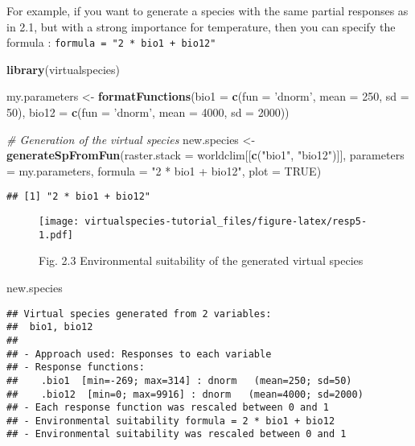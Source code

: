 \documentclass[]{article}
\newenvironment{Shaded}{\begin{snugshade}}{\end{snugshade}}
\newcommand{\KeywordTok}[1]{\textcolor[rgb]{0.13,0.29,0.53}{\textbf{#1}}}
\newcommand{\DataTypeTok}[1]{\textcolor[rgb]{0.13,0.29,0.53}{#1}}
\newcommand{\DecValTok}[1]{\textcolor[rgb]{0.00,0.00,0.81}{#1}}
\newcommand{\StringTok}[1]{\textcolor[rgb]{0.31,0.60,0.02}{#1}}
\newcommand{\CommentTok}[1]{\textcolor[rgb]{0.56,0.35,0.01}{\textit{#1}}}
\newcommand{\OtherTok}[1]{\textcolor[rgb]{0.56,0.35,0.01}{#1}}
\newcommand{\NormalTok}[1]{#1}
\begin{document}
For example, if you want to generate a species with the same partial
responses as in 2.1, but with a strong importance for temperature, then
you can specify the formula :
\texttt{formula\ =\ "2\ *\ bio1\ +\ bio12"}

\begin{Shaded}
\begin{Highlighting}[]
\KeywordTok{library}\NormalTok{(virtualspecies)}

\NormalTok{my.parameters <-}\StringTok{ }\KeywordTok{formatFunctions}\NormalTok{(}\DataTypeTok{bio1 =} \KeywordTok{c}\NormalTok{(}\DataTypeTok{fun =} \StringTok{'dnorm'}\NormalTok{, }\DataTypeTok{mean =} \DecValTok{250}\NormalTok{, }\DataTypeTok{sd =} \DecValTok{50}\NormalTok{),}
                                 \DataTypeTok{bio12 =} \KeywordTok{c}\NormalTok{(}\DataTypeTok{fun =} \StringTok{'dnorm'}\NormalTok{, }\DataTypeTok{mean =} \DecValTok{4000}\NormalTok{, }\DataTypeTok{sd =} \DecValTok{2000}\NormalTok{))}

\CommentTok{# Generation of the virtual species}
\NormalTok{new.species <-}\StringTok{ }\KeywordTok{generateSpFromFun}\NormalTok{(}\DataTypeTok{raster.stack =}\NormalTok{ worldclim[[}\KeywordTok{c}\NormalTok{(}\StringTok{"bio1"}\NormalTok{, }\StringTok{"bio12"}\NormalTok{)]],}
                                 \DataTypeTok{parameters =}\NormalTok{ my.parameters,}
                                 \DataTypeTok{formula =} \StringTok{"2 * bio1 + bio12"}\NormalTok{,}
                                 \DataTypeTok{plot =} \OtherTok{TRUE}\NormalTok{)}
\end{Highlighting}
\end{Shaded}

\begin{verbatim}
## [1] "2 * bio1 + bio12"
\end{verbatim}

\begin{figure}
\centering
\texttt{[image: virtualspecies-tutorial\_files/figure-latex/resp5-1.pdf]}
\caption{Fig. 2.3 Environmental suitability of the generated virtual
species}
\end{figure}

\begin{Shaded}
\begin{Highlighting}[]
\NormalTok{new.species}
\end{Highlighting}
\end{Shaded}

\begin{verbatim}
## Virtual species generated from 2 variables:
##  bio1, bio12
## 
## - Approach used: Responses to each variable
## - Response functions:
##    .bio1  [min=-269; max=314] : dnorm   (mean=250; sd=50)
##    .bio12  [min=0; max=9916] : dnorm   (mean=4000; sd=2000)
## - Each response function was rescaled between 0 and 1
## - Environmental suitability formula = 2 * bio1 + bio12
## - Environmental suitability was rescaled between 0 and 1
\end{verbatim}
\end{document}

